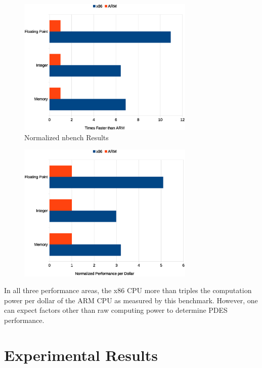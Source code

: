 \documentclass[11pt]{book}
\begin{document}
\begin{figure}
\centering
\includegraphics[width=0.75\textwidth]{nbench_performance}
\caption{Normalized nbench Results}
\label{nbench-performance}
\end{figure}


\begin{figure}
\centering
\includegraphics[width=0.75\textwidth]{nbench_cost}
\label{nbench-cost}
\end{figure}

In all three performance areas, the x86 CPU more than triples the computation
power per dollar of the ARM CPU as measured by this benchmark. However, one can
expect factors other than raw computing power to determine PDES performance.

\newpage
\chapter{Experimental Results}
\label{results}
\end{document}
